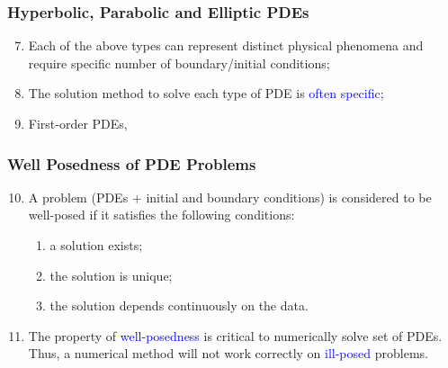 \documentclass[10pt,compress,handout,ignorenonframetext]{beamer}
\begin{document}
\begin{frame}
 \frametitle{Hyperbolic, Parabolic and Elliptic PDEs} 
 \begin{enumerate}
   \setcounter{enumi}{6}
   \item <1-> Each of the above types can represent distinct physical phenomena and require specific number of boundary/initial conditions;
   \item <2->The solution method to solve each type of PDE is \textcolor{blue}{often specific};
   \item <3-> First-order PDEs,

 \end{enumerate}   
 
\end{frame}


\begin{frame}
 \frametitle{Well Posedness of PDE Problems} 
 \begin{enumerate}
   \setcounter{enumi}{9}
   \item <1-> A problem (PDEs + initial and boundary conditions) is considered to be well-posed if it satisfies the following conditions:
      \begin{enumerate}
        \item <2-> a solution exists;
        \item <3-> the solution is unique;
        \item <4-> the solution depends continuously on the data.
      \end{enumerate}
    \item <5-> The property of \textcolor{blue}{well-posedness} is critical to numerically solve set of PDEs. Thus, a numerical method will not work correctly on \textcolor{blue}{ill-posed} problems. 
 \end{enumerate}   
 
\end{frame}
\end{document}
